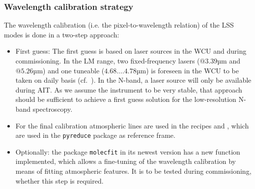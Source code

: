 \subsubsection{Wavelength calibration strategy}\label{ssec:wavecal}
The wavelength calibration (i.e. the pixel-to-wavelength relation) of the \ac{LSS} modes is done in a two-step approach:
\begin{itemize}
    \item First guess: The first guess is based on laser sources in the \ac{WCU} and during commissioning.  In the LM range, two fixed-frequency lasers ($@3.39$µm and $@5.26$µm) and one tuneable ($4.68....4.78$µm) is foreseen in the \ac{WCU} to be taken on daily basis (cf.~\cite{METIS-calibration_plan}). In the N-band, a laser source will only be available during \ac{AIT}. As we assume the instrument to be very stable, that approach should be sufficient to achieve a first guess solution for the low-resolution N-band spectroscopy.
    \item For the final calibration atmospheric lines are used in the recipes  and , which are used in the \texttt{pyreduce} package as reference frame.
    \item Optionally: the package \texttt{molecfit} in its newest version has a new function implemented, which allows a fine-tuning of the wavelength calibration by means of fitting atmospheric features. It is to be tested during commissioning, whether this step is required.
\end{itemize}

